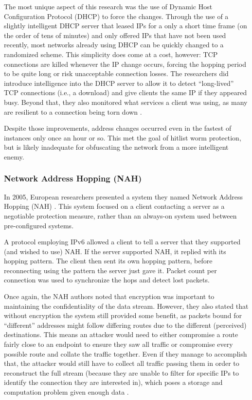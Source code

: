 \par The most unique aspect of this research was the use of Dynamic Host Configuration Protocol (DHCP) to force the changes. Through the use of a slightly intelligent DHCP server that leased IPs for a only a short time frame (on the order of tens of minutes) and only offered IPs that have not been used recently, most networks already using DHCP can be quickly changed to a randomized scheme. This simplicity does come at a cost, however: TCP connections are killed whenever the IP change occurs, forcing the hopping period to be quite long or risk unacceptable connection losses. The researchers did introduce intelligence into the DHCP server to allow it to detect ``long-lived'' TCP connections (i.e., a download) and give clients the same IP if they appeared busy. Beyond that, they also monitored what services a client was using, as many are resilient to a connection being torn down \cite{NASR}.

\par Despite those improvements, address changes occurred even in the fastest of instances only once an hour or so. This met the goal of hitlist worm protection, but is likely inadequate for obfuscating the network from a more intelligent enemy.

\subsubsection{Network Address Hopping (NAH)}
\par In 2005, European researchers presented a system they named Network Address Hopping (NAH) \cite{NAH}. This system focused on a client contacting a server as a negotiable protection measure, rather than an always-on system used between pre-configured systems.

\par A protocol employing \ac{IPv6} allowed a client to tell a server that they supported (and wished to use) NAH. If the server supported NAH, it replied with its hopping pattern. The client then sent its own hopping pattern, before reconnecting using the pattern the server just gave it. Packet count per connection was used to synchronize the hops and detect lost packets.

\par Once again, the NAH authors noted that encryption was important to maintaining the confidentiality of the data stream. However, they also stated that without encryption the system still provided some benefit, as packets bound for ``different'' addresses might follow differing routes due to the different (perceived) destinations. This means an attacker would need to either compromise a route fairly close to an endpoint to ensure they saw all traffic or compromise every possible route and collate the traffic together. Even if they manage to accomplish that, the attacker would still have to collect all traffic passing them in order to reconstruct the full stream (because they are unable to filter for specific IPs to identify the connection they are interested in), which poses a storage and computation problem given enough data \cite{NAH}.

